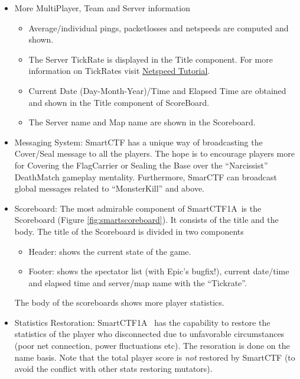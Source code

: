 \documentclass{article}
\newcommand{\SmartVersion}{1A}
\begin{document}
\begin{itemize}
\item More MultiPlayer, Team and Server information
  \begin{itemize}
  \item Average/individual pings, packetlosses and netspeeds are computed and shown.
  \item The Server TickRate is displayed in the Title component.  For more information on TickRates visit \href{http://wiki.unrealadmin.org/Netspeed_Tutorial_(UT)}{\color{Blue}Netspeed Tutorial}.
  \item Current Date (Day-Month-Year)/Time and Elapsed Time are obtained and shown in the Title component of ScoreBoard.
  \item The Server name and Map name are shown in the Scoreboard.
  \end{itemize}
\item Messaging System: SmartCTF has a unique way of broadcasting the Cover/Seal message to all the players.  The hope is to encourage players more for Covering the FlagCarrier or Sealing the Base over the ``Narcissist'' DeathMatch gameplay mentality.  Furthermore, SmarCTF can broadcast global messages related to ``MonsterKill'' and above.
  \item Scoreboard: The most admirable component of SmartCTF\SmartVersion~is the Scoreboard (Figure \ref{fig:smartscoreboard}).  It consists of the title and the body.  The title of the Scoreboard is divided in two components
    \begin{itemize}
    \item Header: shows the current state of the game.
    \item Footer: shows the spectator list (with Epic's bugfix!), current date/time and elapsed time
    and server/map name with the ``Tickrate''.
    \end{itemize}
The body of the scoreboards shows more player statistics.
\item Statistics Restoration: SmartCTF\SmartVersion~ has the capability to restore the statistics of the player who disconnected due to unfavorable circumstances (poor net connection, power fluctuations etc).  The resoration is done on the name basis.  Note that the total player score is \emph{not} restored by SmartCTF (to avoid the conflict with other stats restoring mutators).

\end{itemize}
\end{document}
